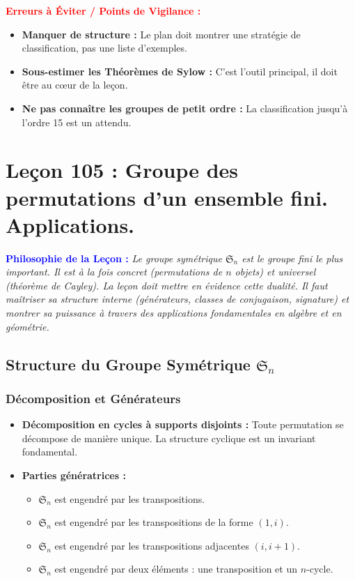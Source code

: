 \documentclass[12pt, a4paper, parskip=full]{report}
\theoremstyle{agregstyle}
\newenvironment{philosophie}
  {\par\medskip\noindent\begin{oframed}\noindent\textbf{\textcolor{blue}{Philosophie de la Leçon :}}\itshape}
  {\end{oframed}\par\medskip}
\newenvironment{erreurs}
  {\par\medskip\noindent\begin{oframed}\noindent\textbf{\textcolor{red}{Erreurs à Éviter / Points de Vigilance :}}}
  {\end{oframed}\par\medskip}
\begin{document}
\begin{erreurs}
    \begin{itemize}
        \item \textbf{Manquer de structure :} Le plan doit montrer une stratégie de classification, pas une liste d'exemples.
        \item \textbf{Sous-estimer les Théorèmes de Sylow :} C'est l'outil principal, il doit être au cœur de la leçon.
        \item \textbf{Ne pas connaître les groupes de petit ordre :} La classification jusqu'à l'ordre 15 est un attendu.
    \end{itemize}
\end{erreurs}

\newpage
\chapter{Leçon 105 : Groupe des permutations d'un ensemble fini. Applications.}

\begin{philosophie}
    Le groupe symétrique $\mathfrak{S}_n$ est le groupe fini le plus important. Il est à la fois concret (permutations de $n$ objets) et universel (théorème de Cayley). La leçon doit mettre en évidence cette dualité. Il faut maîtriser sa structure interne (générateurs, classes de conjugaison, signature) et montrer sa puissance à travers des applications fondamentales en algèbre et en géométrie.
\end{philosophie}

\section{Structure du Groupe Symétrique $\mathfrak{S}_n$}
\subsection{Décomposition et Générateurs}
\begin{itemize}
    \item \textbf{Décomposition en cycles à supports disjoints :} Toute permutation se décompose de manière unique. La structure cyclique est un invariant fondamental.
    \item \textbf{Parties génératrices :}
        \begin{itemize}
            \item $\mathfrak{S}_n$ est engendré par les transpositions.
            \item $\mathfrak{S}_n$ est engendré par les transpositions de la forme $(1, i)$.
            \item $\mathfrak{S}_n$ est engendré par les transpositions adjacentes $(i, i+1)$.
            \item $\mathfrak{S}_n$ est engendré par deux éléments : une transposition et un $n$-cycle.
        \end{itemize}
\end{itemize}
\end{document}
